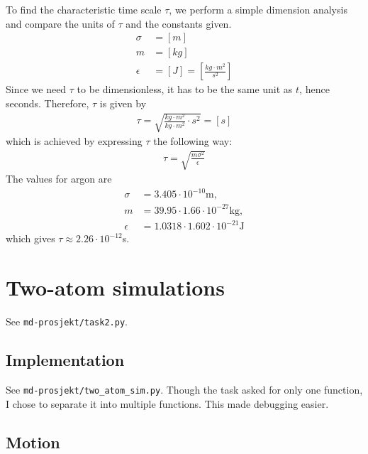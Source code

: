\documentclass[a4paper,10pt,english]{article}
\begin{document}
To find the characteristic time scale $\tau$, we perform a simple dimension analysis and compare the units of $\tau$ and the constants given.
\begin{align*}
    \sigma &= [m] \\
    m &= [kg] \\
    \epsilon &= [J] = \left[ \frac{kg \cdot m^2}{s^2} \right]
\end{align*}
Since we need $\tau$ to be dimensionless, it has to be the same unit as $t$, hence seconds. Therefore, $\tau$ is given by
\begin{align*}
    \tau = \sqrt{\frac{kg \cdot m^2}{kg \cdot m^2} \cdot s^2} = [s]
\end{align*}
which is achieved by expressing $\tau$ the following way:
\begin{align}
    \tau = \sqrt{\frac{m\sigma^2}{\epsilon}}
\end{align}
The values for argon are 
\begin{align*}
    \sigma &= 3.405 \cdot 10^{-10} \text{m}, \\
    m &= 39.95 \cdot 1.66 \cdot 10^{-27} \text{kg}, \\
    \epsilon &= 1.0318 \cdot 1.602 \cdot 10^{-21} \text{J}
\end{align*}
which gives $\tau \approx 2.26 \cdot 10^{-12}$s.

\newpage

\section{Two-atom simulations} \label{2}

See \verb|md-prosjekt/task2.py|.

\subsection{Implementation} \label{2a}

See \verb|md-prosjekt/two_atom_sim.py|. Though the task asked for only one function, I chose to separate it into multiple functions. This made debugging easier.

\subsection{Motion} \label{2b}
\end{document}
